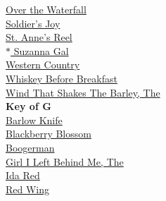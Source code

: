 \documentclass{book}
\begin{document}
\-\hspace{4ex}\hyperlink{tunes.9}{Over the Waterfall} \\
\-\hspace{4ex}\hyperlink{tunes.11}{Soldier's Joy} \\
\-\hspace{4ex}\hyperlink{tunes.12}{St. Anne's Reel} \\
\-\hspace{4ex}\hyperlink{tunes.12}{$\ast$ Suzanna Gal} \\
\-\hspace{4ex}\hyperlink{tunes.12}{Western Country} \\
\-\hspace{4ex}\hyperlink{tunes.13}{Whiskey Before Breakfast} \\
\-\hspace{4ex}\hyperlink{tunes.13}{Wind That Shakes The Barley, The} \\
\textbf{Key of G} \\
\-\hspace{4ex}\hyperlink{tunes.2}{Barlow Knife} \\
\-\hspace{4ex}\hyperlink{tunes.2}{Blackberry Blossom} \\
\-\hspace{4ex}\hyperlink{tunes.3}{Boogerman} \\
\-\hspace{4ex}\hyperlink{tunes.4}{Girl I Left Behind Me, The} \\
\-\hspace{4ex}\hyperlink{tunes.5}{Ida Red} \\
\-\hspace{4ex}\hyperlink{tunes.10}{Red Wing} \\
\end{document}
